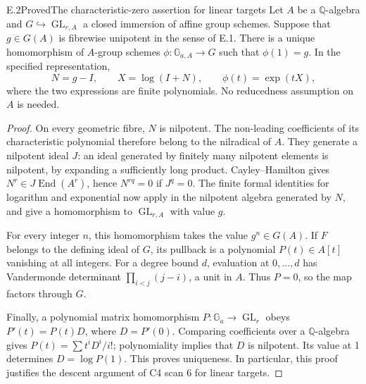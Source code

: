 \begin{statement}{E.2}{Proved}{The characteristic-zero assertion for linear targets}
Let \(A\) be a \(\mathbb Q\)-algebra and
\(G\hookrightarrow\operatorname{GL}_{r,A}\) a closed immersion of affine
group schemes.  Suppose that \(g\in G(A)\) is fibrewise unipotent in the
sense of E.1.  There is a unique homomorphism of \(A\)-group schemes
\(\phi:\mathbb G_{a,A}\to G\) such that \(\phi(1)=g\).  In the specified
representation,
\[
 N=g-I,\qquad X=\log(I+N),\qquad \phi(t)=\exp(tX),
\]
where the two expressions are finite polynomials.  No reducedness
assumption on \(A\) is needed.
\end{statement}
\begin{proof}
On every geometric fibre, \(N\) is nilpotent.  The non-leading
coefficients of its characteristic polynomial therefore belong to the
nilradical of \(A\).  They generate a nilpotent ideal \(J\): an ideal
generated by finitely many nilpotent elements is nilpotent, by expanding
a sufficiently long product.  Cayley--Hamilton gives
\(N^r\in J\operatorname{End}(A^r)\), hence \(N^{rq}=0\) if \(J^q=0\).
The finite formal identities for logarithm and exponential now apply in
the nilpotent algebra generated by \(N\), and give a homomorphism to
\(\operatorname{GL}_{r,A}\) with value \(g\).

For every integer \(n\), this homomorphism takes the value \(g^n\in G(A)\).
If \(F\) belongs to the defining ideal of \(G\), its pullback is a
polynomial \(P(t)\in A[t]\) vanishing at all integers.  For a degree
bound \(d\), evaluation at \(0,\ldots,d\) has Vandermonde determinant
\(\prod_{i<j}(j-i)\), a unit in \(A\).  Thus \(P=0\), so the map factors
through \(G\).

Finally, a polynomial matrix homomorphism \(P:\mathbb G_a\to
\operatorname{GL}_r\) obeys
\(P'(t)=P(t)D\), where \(D=P'(0)\).  Comparing coefficients over a
\(\mathbb Q\)-algebra gives \(P(t)=\sum t^iD^i/i!\); polynomiality
implies that \(D\) is nilpotent.  Its value at 1 determines
\(D=\log P(1)\).  This proves uniqueness.  In particular, this proof
justifies the descent argument of C4 scan 6 for linear targets.
\end{proof}

